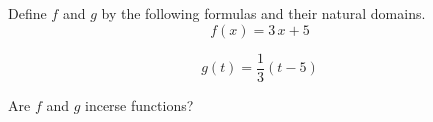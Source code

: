 \documentclass{ximera}
\begin{document}
\begin{exercise}
\begin{question}
\begin{multipleChoice}
\end{multipleChoice}

\end{question}









\begin{question}

Define $f$ and $g$ by the following formulas and their natural domains. \\


\[
f(x) = 3 \, x + 5
\]



\[
g(t) = \frac{1}{3} (t - 5)
\]


Are $f$ and $g$ incerse functions? \\


\begin{multipleChoice}
\end{multipleChoice}

\end{question}


\end{exercise}
\end{document}
